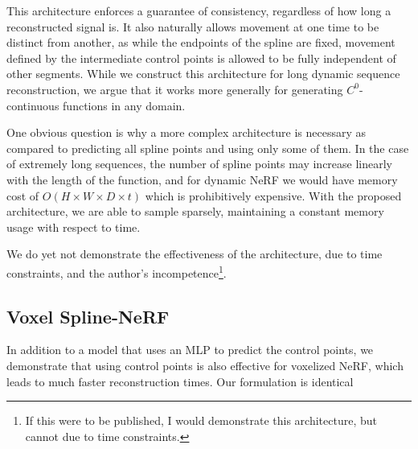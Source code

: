This architecture enforces a guarantee of consistency, regardless of how long a reconstructed signal is. It also naturally allows movement at one time to be distinct from another,
as while the endpoints of the spline are fixed, movement defined by the intermediate control points is allowed to be fully independent of other
segments. While we construct this architecture for long dynamic sequence reconstruction, we argue that it works more generally for generating $C^0$-continuous functions in any domain.

One obvious question is why a more complex architecture is necessary as compared to predicting all spline points and using only some of them. In the case of extremely long sequences, the number of spline points may increase linearly with the length of the function, and for dynamic NeRF we would have memory cost of $O(H\times W\times D\times t)$ which is prohibitively expensive. With the proposed architecture, we are able to sample sparsely, maintaining a constant memory usage with respect to time.

We do yet not demonstrate the effectiveness of the architecture, due to time constraints, and the author's incompetence\footnote{If this were to be published, I would demonstrate this architecture, but cannot due to time constraints.}.
\fi

\subsection{Voxel Spline-NeRF}

In addition to a model that uses an MLP to predict the control points, we demonstrate that using control points is also effective for voxelized NeRF, which leads to much faster reconstruction times. Our formulation is identical